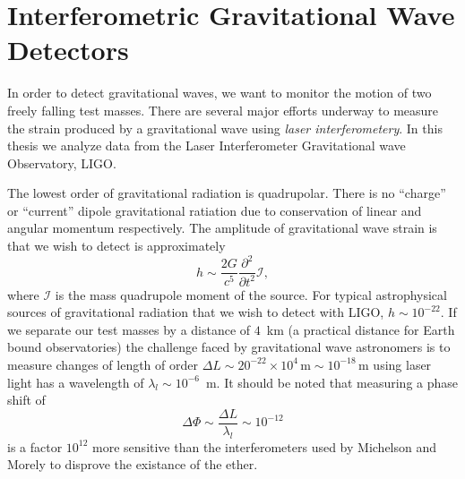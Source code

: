 \section{Interferometric Gravitational Wave Detectors}
\label{s:ifos}

In order to detect gravitational waves, we want to monitor the motion of two
freely falling test masses. There are several major efforts
underway\cite{ligo,geo,virgo} to measure the strain produced by a
gravitational wave using \emph{laser interferometery}. In this thesis we 
analyze data from the Laser Interferometer Gravitational wave Observatory,
LIGO.

The lowest order of gravitational radiation is quadrupolar. There is no
``charge'' or ``current'' dipole gravitational ratiation due to conservation
of linear and angular momentum respectively. The amplitude of gravitational
wave strain is that we wish to detect is approximately\cite{thorne.k:1987}
\begin{equation}
h \sim \frac{2G}{c^5} \frac{\partial^2}{\partial t^2} \mathcal{I},
\end{equation}
where $\mathcal{I}$ is the mass quadrupole moment of the source. For typical
astrophysical sources of gravitational radiation that we wish to detect with
LIGO, $h \sim 10^{-22}$. If we separate our test masses by a distance of
$4$~km (a practical distance for Earth bound observatories) the challenge
faced by gravitational wave astronomers is to measure changes of length of
order $\Delta L \sim 20^{-22} \times 10^4\,\mathrm{m} \sim
10^{-18}\,\mathrm{m}$ using laser light has a wavelength of $\lambda_l \sim
10^{-6}$~m.  It should be noted that measuring a phase shift of
\begin{equation}
\Delta \Phi \sim \frac{\Delta L}{\lambda_l} \sim 10^{-12}
\end{equation}
is a factor $10^{12}$ more sensitive than the interferometers used by
Michelson and Morely to disprove the existance of the ether.

